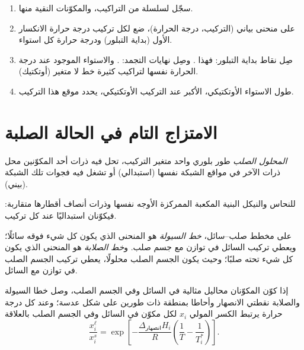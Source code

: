 \begin{method}\label{met:b2:solid-liquid-diagrams:diagram-from-curves}
\begin{enumerate}
  \item سجّل  لسلسلة من التراكيب، والمكوّنات النقية
        منها.
  \item على منحنى بياني (التركيب، درجة الحرارة)، ضع لكل تركيب
        درجة حرارة الانكسار الأول (بداية التبلور) ودرجة حرارة
        كل استواء.
  \item صِل نقاط بداية التبلور: فهذا . وصِل
        نهايات التجمد: . والاستواء الموجود عند درجة الحرارة
        نفسها لتراكيب كثيرة خط لا متغير (أوتكتيك).
  \item طول الاستواء الأوتكتيكي، الأكبر عند التركيب
        الأوتكتيكي، يحدد موقع هذا التركيب.
\end{enumerate}
\end{method}

\section{الامتزاج التام في الحالة الصلبة}

\begin{definition}\label{def:b2:solid-liquid-diagrams:solid-solution}
\emph{المحلول الصلب} طور بلوري واحد متغير
التركيب، تحل فيه ذرات أحد المكوّنين محل ذرات
الآخر في مواقع الشبكة نفسها (استبدالي) أو تشغل فيه فجوات
تلك الشبكة (بيني).
\end{definition}

للنحاس والنيكل البنية المكعبة الممركزة الأوجه نفسها وذرات أنصاف
أقطارها متقاربة: فيكوّنان  استبداليًا عند كل تركيب.

\begin{definition}\label{def:b2:solid-liquid-diagrams:liquidus}
على مخطط صلب--سائل، \emph{خط السيولة} هو المنحنى
الذي يكون كل شيء فوقه سائلًا؛ ويعطي تركيب السائل في
توازن مع جسم صلب. و\emph{خط الصلابة} هو المنحنى الذي يكون
كل شيء تحته صلبًا؛ وحيث يكون الجسم الصلب محلولًا، يعطي
تركيب الجسم الصلب في توازن مع السائل.
\end{definition}

\begin{proposition}[العدسة]\label{prop:b2:solid-liquid-diagrams:lens}
إذا كوّن المكوّنان محاليل مثالية في السائل وفي الجسم الصلب،
وصل خطا السيولة والصلابة نقطتي الانصهار وأحاطا بمنطقة ذات
طورين على شكل عدسة؛ وعند كل درجة حرارة يرتبط الكسر المولي $x_i$
لكل مكوّن في السائل وفي الجسم الصلب بالعلاقة
\[
  \frac{x_i^{\ell}}{x_i^{s}} = \exp\left[-\frac{\Delta_{\text{انصهار}}H_i}{R}\left(\frac1T - \frac1{T_i^*}\right)\right] .
\]
\end{proposition}

